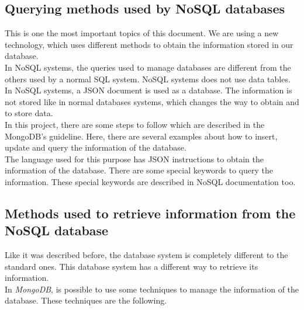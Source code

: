 \subsection{Querying methods used by NoSQL databases}

This is one the most important topics of this document. We are using a new technology, which uses different methods to obtain the information stored in our database.\\

In NoSQL systems, the queries used to manage databases are different from the others used by a normal SQL system. NoSQL systems does not use data tables. In NoSQL systems, a JSON document is used as a database. The information is not stored like in normal databases systems, which changes the way to obtain and to store data.\\

In this project, there are some steps to follow which are described in the MongoDB's guideline. Here, there are several examples about how to insert, update and query the information of the database.\\

The language used for this purpose has JSON instructions to obtain the information of the database. There are some special keywords to query the information. These special keywords are described in NoSQL documentation too.

\subsection{Methods used to retrieve information from the NoSQL database}

Like it was described before, the database system is completely different to the standard ones. This database system has a different way to retrieve its information.\\

In \textit{MongoDB}, is possible to use some techniques to manage the information of the database. These techniques are the following.

